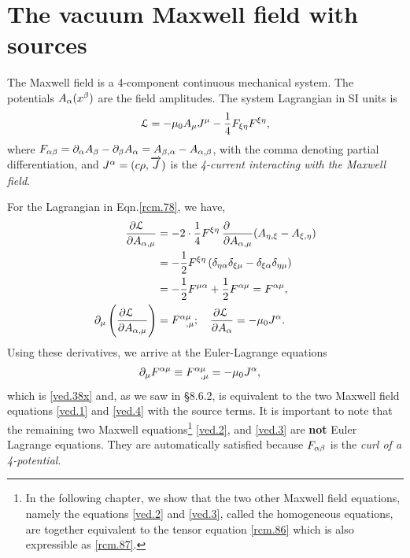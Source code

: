 \section{The vacuum Maxwell field with  
sources}
The {Maxwell field is a 4-component continuous  
mechanical system}. The potentials $A_{{\alpha}}  (x^{{\beta}})$ are 
the  field   amplitudes. The system Lagrangian in {SI 
units} is
\begin{align}\label{rcm.78}
\EuScript{L}=-\mu_0 A_{{\mu}} J^{{\mu}}-\frac{1}{4}F_{{\xi}{\eta}}
F^{{\xi}{\eta}},
\end{align}
where $ F_{{\alpha}{\beta}}={\partial}_{{\alpha}} A_{{\beta}}-{\partial}_{{\beta}} A_{{\alpha}}= 
A_{{\beta},{\alpha}}-A_{{\alpha},{\beta}}$,  with the comma denoting 
partial differentiation, and $ J^{{\alpha}}=(c\rho,\overrightarrow{J}) $ is 
the  \textsl{4-current interacting with the Maxwell 
field}. 

For the Lagrangian in Eqn.\eqref{rcm.78}, we have,
\begin{align}\label{rcm.79}
\frac{\dow\EuScript{L}\;\;\;}{\dow A_{\gka,\gkm}}
&=-2\cdot\frac{1}{4} F^{\gkx\gky}\:
\frac{\dow\phantom{A_{\gka,\gkm}}}
{\dow A_{\gka,\gkm}}(A_{\gky,\gkx} - A_{\gkx,\gky})\notag\\
&=-\frac{1}{2}F^{\gkx\gky}\,
(\delta_{\gky\gka}\delta_{\gkx\gkm} -
\delta_{\gkx\gka}\delta_{\gky\gkm})\notag\\&=
-\frac{1}{2} F^{\gkm\gka}+\frac{1}{2} F^{\gka\gkm}
=F^{\gka\gkm},\\\label{rcm.80}
\dow_\gkm\left(\frac{\dow\EuScript{L}\;\;\;\;}{\dow
A_{\gka,\gkm}}
\right)&= F^{\gka\gkm}_{\;\;\;,\gkm}; \quad
\frac{\dow\EuScript{L}\;}{\dow
A_\gka}=-\muo J^\gka.
\end{align}
Using these derivatives, we arrive at the Euler-Lagrange 
equations
\begin{align}\label{rcm.81}
{\ensuremath{\partial}}_{{\mu}} F^{{\alpha}{\mu}}
\equiv F^{{\alpha}{\mu}}_{\;\;\;,{\mu}}&=-\mu_0 J^{{\alpha}},
\end{align}
which is \eqref{ved.38x} and, as we saw in \S8.6.2, is 
equivalent to the two Maxwell field equations \eqref{ved.1} 
and \eqref{ved.4} with the source terms.  It is important 
to note that the remaining two Maxwell  
equations\footnote{In the following chapter, we show that 
the two other Maxwell field equations, namely the  
equations 
\eqref{ved.2} and \eqref{ved.3}, called the {homogeneous  
equations},  are together equivalent to the tensor equation 
\eqref{rcm.86} which is also expressible as \eqref{rcm.87}. 
} \eqref{ved.2}, and  \eqref{ved.3} are \textbf{not} 
Euler Lagrange equations. They are automatically satisfied 
because $F_{{\alpha}{\beta}}$ is the \textsl{curl of a 
4-potential}.

